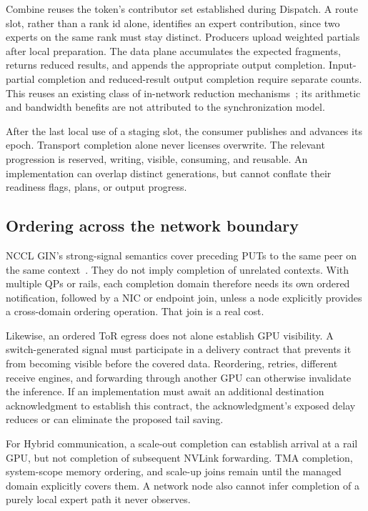 Combine reuses the token's contributor set established during Dispatch. A route slot, rather than a rank id alone, identifies an expert contribution, since two experts on the same rank must stay distinct. Producers upload weighted partials after local preparation. The data plane accumulates the expected fragments, returns reduced results, and appends the appropriate output completion. Input-partial completion and reduced-result output completion require separate counts. This reuses an existing class of in-network reduction mechanisms~\cite{dysharp,switchml}; its arithmetic and bandwidth benefits are not attributed to the synchronization model.

After the last local use of a staging slot, the consumer publishes \recycle{} and advances its epoch. Transport completion alone never licenses overwrite. The relevant progression is reserved, writing, visible, consuming, and reusable. An implementation can overlap distinct generations, but cannot conflate their readiness flags, plans, or output progress.

\subsection{Ordering across the network boundary}
NCCL GIN's strong-signal semantics cover preceding PUTs to the same peer on the same context~\cite{gindocs}. They do not imply completion of unrelated contexts. With multiple QPs or rails, each completion domain therefore needs its own ordered notification, followed by a NIC or endpoint join, unless a node explicitly provides a cross-domain ordering operation. That join is a real cost.

Likewise, an ordered ToR egress does not alone establish GPU visibility. A switch-generated signal must participate in a delivery contract that prevents it from becoming visible before the covered data. Reordering, retries, different receive engines, and forwarding through another GPU can otherwise invalidate the inference. If an implementation must await an additional destination acknowledgment to establish this contract, the acknowledgment's exposed delay reduces or can eliminate the proposed tail saving.

For Hybrid communication, a scale-out completion can establish arrival at a rail GPU, but not completion of subsequent NVLink forwarding. TMA completion, system-scope memory ordering, and scale-up joins remain until the managed domain explicitly covers them. A network node also cannot infer completion of a purely local expert path it never observes.

